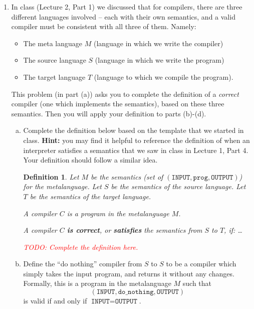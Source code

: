 \documentclass{article}
\theoremstyle{plain}
\newtheorem{definition}{Definition}
\begin{document}
\begin{enumerate}


\item
In class (Lecture 2, Part 1)
we discussed that for compilers, there are three different languages involved -- each with their own semantics, and a valid compiler must be consistent with all three of them. Namely:
\begin{itemize}
\item The meta language $M$ (language in which we write the compiler)
\item The source language $S$ (language in which we write the program)
\item The target language $T$ (language to which we compile the program).
\end{itemize}

This problem (in part (a)) asks you to complete the definition of a \emph{correct} compiler (one which implements the semantics), based on these three semantics. Then you will apply your definition to parts (b)-(d).

\begin{enumerate}[(a)]
\item
Complete the definition below based on the template that we started in class. \textbf{Hint:} you may find it helpful to reference the definition of when an interpreter satisfies a semantics that we saw in class in Lecture 1, Part 4. Your definition should follow a similar idea.

\begin{definition}
Let $M$ be the semantics (set of $(\texttt{INPUT}, \texttt{prog}, \texttt{OUTPUT})$) for the metalanguage. Let $S$ be the semantics of the source language. Let $T$ be the semantics of the target language.

A compiler $C$ is a program in the metalanguage $M$.

A compiler $C$ \textbf{is correct}, or \textbf{satisfies} the semantics from $S$ to $T$, if: \ldots

\textcolor{red}{TODO: Complete the definition here.}
\end{definition}

\item
Define the ``do nothing'' compiler from $S$ to $S$
to be a compiler which simply takes the input program, and returns it without any changes.
Formally, this is a program in the metalanguage $M$ such that
$$
(\texttt{INPUT}, \texttt{do\_nothing}, \texttt{OUTPUT})
$$
is valid if and only if $\texttt{INPUT} = \texttt{OUTPUT}$.


\end{enumerate}
\end{enumerate}
\end{document}
